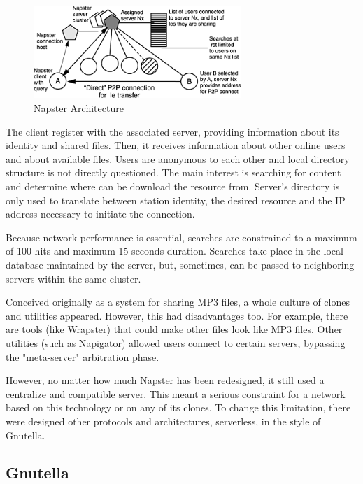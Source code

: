 \begin{figure}
  \centering
  \includegraphics[width=0.7\textwidth]{src/img/p2p-systems/napster}
  \caption{Napster Architecture}
  \label{fig:p2p-systems:napster}
\end{figure}

The client register with the associated server, providing information about
its identity and shared files. Then, it receives information about other online
users and about available files. Users are anonymous to each other and local
directory structure is not directly questioned. The main interest is searching
for content and determine where can be download the resource from. Server's
directory is only used to translate between station identity, the desired
resource and the IP address necessary to initiate the connection.

Because network performance is essential, searches are constrained to a maximum
of 100 hits and maximum 15 seconds duration. Searches take place in the local
database maintained by the server, but, sometimes, can be passed to neighboring
servers within the same cluster.

Conceived originally as a system for sharing MP3 files, a whole culture of
clones and utilities appeared. However, this had disadvantages too. For example,
there are tools (like Wrapster) that could make other files look like MP3 files.
Other utilities (such as Napigator) allowed users connect to certain servers,
bypassing the "meta-server" arbitration phase.

However, no matter how much Napster has been redesigned, it still used a
centralize and compatible server. This meant a serious constraint for a network
based on this technology or on any of its clones. To change this limitation,
there were designed other protocols and architectures, serverless, in the style
of Gnutella.

\subsection{Gnutella}


